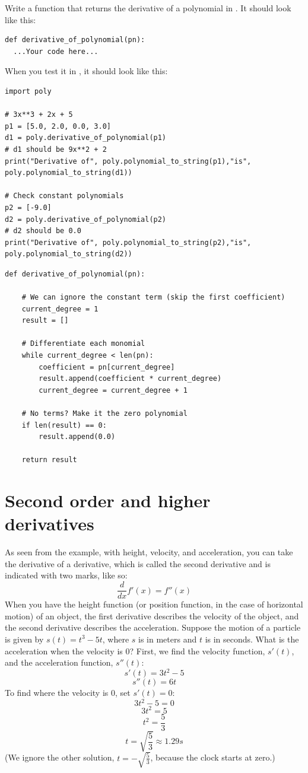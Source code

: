 \begin{Exercise}[title={Differentiation of polynomials in Python}, label=pydiffpoly]
  Write a function that returns the derivative of a polynomial in . It should look like this:
\begin{verbatim}
def derivative_of_polynomial(pn):
  ...Your code here...
\end{verbatim}
When you test it in , it should look like this:
\begin{verbatim}
import poly

# 3x**3 + 2x + 5
p1 = [5.0, 2.0, 0.0, 3.0]
d1 = poly.derivative_of_polynomial(p1)
# d1 should be 9x**2 + 2
print("Derivative of", poly.polynomial_to_string(p1),"is", poly.polynomial_to_string(d1))

# Check constant polynomials
p2 = [-9.0]
d2 = poly.derivative_of_polynomial(p2)
# d2 should be 0.0
print("Derivative of", poly.polynomial_to_string(p2),"is", poly.polynomial_to_string(d2))
\end{verbatim}
\end{Exercise}
\begin{Answer}[ref=pydiffpoly]
\begin{verbatim}
def derivative_of_polynomial(pn):

    # We can ignore the constant term (skip the first coefficient)
    current_degree = 1
    result = []

    # Differentiate each monomial
    while current_degree < len(pn):
        coefficient = pn[current_degree]
        result.append(coefficient * current_degree)
        current_degree = current_degree + 1

    # No terms? Make it the zero polynomial
    if len(result) == 0:
        result.append(0.0)

    return result
\end{verbatim}
\end{Answer}

\section{Second order and higher derivatives}
As seen from the example, with height, velocity, and acceleration, you can take the derivative of a derivative, which is called the second derivative and is indicated with two marks, like so: 
$$\frac{d}{dx}f'(x) = f''(x)$$
When you have the height function (or position function, in the case of horizontal motion) of an object, the first derivative describes the velocity of the object, and the second derivative describes the acceleration. Suppose the motion of a particle is given by $s(t) = t^3-5t$, where $s$ is in meters and $t$ is in seconds.  What is the acceleration when the velocity is $0$? First, we find the velocity function, $s'(t)$, and the acceleration function, $s''(t)$:
$$s'(t) = 3t^2-5$$
$$s''(t) = 6t$$
To find where the velocity is $0$, set $s'(t) = 0$:
$$3t^2-5=0$$
$$3t^2=5$$
$$t^2=\frac{5}{3}$$
$$t = \sqrt{\frac{5}{3}} \approx 1.29s$$ (We ignore the other solution, $t=-\sqrt{\frac{5}{3}}$, because the clock starts at zero.)


